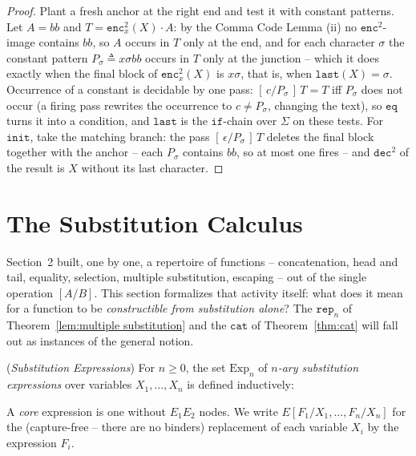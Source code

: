 \documentclass[runningheads,envcountsect]{llncs}
\begin{document}
\begin{proof}
    Plant a fresh anchor at the right end and test it with constant patterns. Let $A = bb$ and $T = \mathtt{enc}^2_{x}(X) \cdot A$: by the Comma Code Lemma (ii) no $\mathtt{enc}^2$-image contains $bb$, so $A$ occurs in $T$ only at the end, and for each character $\sigma$ the constant pattern $P_\sigma \triangleq x\sigma bb$ occurs in $T$ only at the junction -- which it does exactly when the final block of $\mathtt{enc}^2_{x}(X)$ is $x\sigma$, that is, when $\mathtt{last}(X) = \sigma$. Occurrence of a constant is decidable by one pass: $[\,c/P_\sigma\,]\,T = T$ iff $P_\sigma$ does not occur (a firing pass rewrites the occurrence to $c \neq P_\sigma$, changing the text), so $\mathtt{eq}$ turns it into a condition, and $\mathtt{last}$ is the $\mathtt{if}$-chain over $\Sigma$ on these tests. For $\mathtt{init}$, take the matching branch: the pass $[\,\epsilon/P_\sigma\,]\,T$ deletes the final block together with the anchor -- each $P_\sigma$ contains $bb$, so at most one fires -- and $\mathtt{dec}^2$ of the result is $X$ without its last character.
\end{proof}

\section{The Substitution Calculus}
\label{sec:calculus}

Section~2 built, one by one, a repertoire of functions -- concatenation, head and tail, equality, selection, multiple substitution, escaping -- out of the single operation $[A/B]$. This section formalizes that activity itself: what does it mean for a function to be \emph{constructible from substitution alone}? The $\mathtt{rep}_n$ of Theorem~\ref{lem:multiple substitution} and the $\mathtt{cat}$ of Theorem~\ref{thm:cat} will fall out as instances of the general notion.

\begin{definition}
    (\emph{Substitution Expressions})
    \label{def:exp}
    For $n \geq 0$, the set $\mathrm{Exp}_n$ of \emph{$n$-ary substitution expressions} over variables $X_1, \dots, X_n$ is defined inductively:
    A \emph{core} expression is one without $E_1E_2$ nodes. We write $E[F_1/X_1, \dots, F_n/X_n]$ for the (capture-free -- there are no binders) replacement of each variable $X_i$ by the expression $F_i$.
\end{definition}
\end{document}
